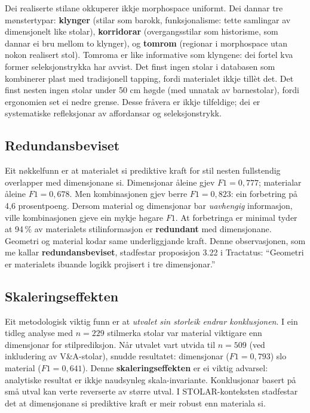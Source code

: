 \documentclass[10pt, a4paper, twocolumn]{article}
\begin{document}
Dei realiserte stilane okkuperer ikkje morphospace uniformt. Dei dannar tre mønstertypar: \textbf{klynger} (stilar som barokk, funksjonalisme: tette samlingar av dimensjonelt like stolar), \textbf{korridorar} (overgangsstilar som historisme, som dannar ei bru mellom to klynger), og \textbf{tomrom} (regionar i morphospace utan nokon realisert stol). Tomroma er like informative som klyngene: dei fortel kva former seleksjonstrykka har avvist. Det finst ingen stolar i databasen som kombinerer plast med tradisjonell tapping, fordi materialet ikkje tillèt det. Det finst nesten ingen stolar under 50 cm høgde (med unnatak av barnestolar), fordi ergonomien set ei nedre grense. Desse fråvera er ikkje tilfeldige; dei er systematiske refleksjonar av affordansar og seleksjonstrykk.

\subsection{Redundansbeviset}

Eit nøkkelfunn er at materialet si prediktive kraft for stil nesten fullstendig overlapper med dimensjonane si. Dimensjonar åleine gjev $F1 = 0{,}777$; materialar åleine $F1 = 0{,}678$. Men kombinasjonen gjev berre $F1 = 0{,}823$: ein forbetring på 4,6 prosentpoeng. Dersom material og dimensjonar bar \emph{uavhengig} informasjon, ville kombinasjonen gjeve ein mykje høgare $F1$. At forbetringa er minimal tyder at 94\,\% av materialets stilinformasjon er \textbf{redundant} med dimensjonane. Geometri og material kodar same underliggjande kraft. Denne observasjonen, som me kallar \textbf{redundansbeviset}, stadfestar proposisjon 3.22 i Tractatus: ``Geometri er materialets ibuande logikk projisert i tre dimensjonar.''

\subsection{Skaleringseffekten}

Eit metodologisk viktig funn er at \emph{utvalet sin storleik endrar konklusjonen}. I ein tidleg analyse med $n = 229$ stilmerka stolar var material viktigare enn dimensjonar for stilprediksjon. Når utvalet vart utvida til $n = 509$ (ved inkludering av V\&A-stolar), snudde resultatet: dimensjonar ($F1 = 0{,}793$) slo material ($F1 = 0{,}641$). Denne \textbf{skaleringseffekten} er ei viktig advarsel: analytiske resultat er ikkje naudsynleg skala-invariante. Konklusjonar basert på små utval kan verte reverserte av større utval. I STOLAR-konteksten stadfestar det at dimensjonane si prediktive kraft er meir robust enn materiala si.
\end{document}

